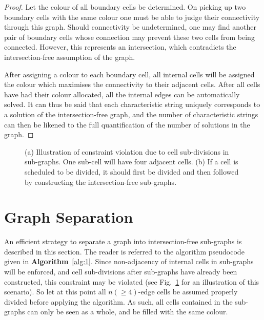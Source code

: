 \documentclass[journal]{IEEEtran}
\begin{document}
\begin{proof}
Let the colour of all boundary cells be determined. On picking up two boundary cells with the same colour one must be able to judge their connectivity through this graph. Should connectivity be undetermined, one may find another pair of boundary cells whose connection may prevent these two cells from being connected. However, this represents an intersection, which contradicts the intersection-free assumption of the graph. 

After assigning a colour to each boundary cell, all internal cells will be assigned the colour which maximises the connectivity to their adjacent cells. 
After all cells have had their colour allocated, all the internal edges can be  automatically solved. 
It can thus be said that each characteristic string uniquely corresponds to a solution of the intersection-free graph, 
and the number of characteristic strings can then be likened to the full quantification of the number of solutions in the graph. 
\end{proof}
\begin{figure}[t]
\centering
{}
\caption{(a) Illustration of constraint violation due to cell sub-divisions in sub-graphs. One sub-cell will have four adjacent cells. (b) If a cell is scheduled to be divided, it should first be divided and then followed by constructing the intersection-free sub-graphs.}
\label{fig:constraint_violation}
\end{figure}

\section{Graph Separation}
\label{section_graph_separation}
An efficient strategy to separate a graph into intersection-free sub-graphs is described in this section. 
The reader is referred to the algorithm pseudocode given in \textbf{Algorithm}~\ref{alg:1}.
Since non-adjacency of internal cells in sub-graphs will be enforced, and cell sub-divisions after sub-graphs have already been constructed, 
this constraint may be violated (see Fig.~\ref{fig:constraint_violation} for an illustration of this scenario).
So let at this point all $n(\geq 4)$-edge cells be assumed properly divided before applying the algorithm. As such, 
all cells contained in the sub-graphs can only be seen as a whole, and be filled with the same colour. 
\end{document}
